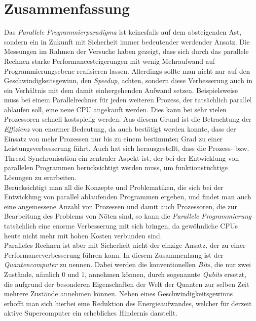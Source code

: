 
\chapter*{Zusammenfassung} %

	\thispagestyle{empty}

	Das \textit{Parallele Programmierparadigma} ist keinesfalls auf dem absteigenden Ast, sondern ein in Zukunft mit Sicherheit immer bedeutender werdender Ansatz. Die Messungen im Rahmen der Versuche haben gezeigt, dass sich durch das parallele Rechnen starke Performancesteigerungen mit wenig Mehraufwand auf Programmierungsebene realisieren lassen. Allerdings sollte man nicht nur auf den Geschwindigkeitsgewinn, den \textit{Speedup}, achten, sondern diese Verbesserung auch in ein Verhältnis mit dem damit einhergehenden Aufwand setzen. Beispielsweise muss bei einem Parallelrechner für jeden weiteren Prozess, der tatsächlich parallel ablaufen soll, eine neue CPU angekauft werden. Dies kann bei sehr vielen Prozessoren schnell kostspielig werden. Aus diesem Grund ist die Betrachtung der \textit{Effizienz} von enormer Bedeutung, da auch bestätigt werden konnte, dass der Einsatz von mehr Prozessen nur bis zu einem bestimmten Grad zu einer Leistungsverbesserung führt. Auch hat sich herausgestellt, dass die Prozess- bzw. Thread-Synchronisation ein zentraler Aspekt ist, der bei der Entwicklung von parallelen Programmen berücksichtigt werden muss, um funktionstüchtige Lösungen zu erarbeiten.\\
	Berücksichtigt man all die Konzepte und Problematiken, die sich bei der Entwicklung von parallel ablaufenden Programmen ergeben, und findet man auch eine angemessene Anzahl von Prozessen und damit auch Prozessoren, die zur Bearbeitung des Problems von Nöten sind, so kann die \textit{Parallele Programmierung} tatsächlich eine enorme Verbesserung mit sich bringen, da gewöhnliche CPUs heute nicht mehr mit hohen Kosten verbunden sind.\\
	Paralleles Rechnen ist aber mit Sicherheit nicht der einzige Ansatz, der zu einer Performanceverbesserung führen kann. In diesem Zusammenhang ist der \textit{Quantencomputer} zu nennen. Dabei werden die konventionellen \textit{Bits}, die nur zwei Zustände, nämlich 0 und 1, annehmen können, durch sogenannte \textit{Qubits} ersetzt, die aufgrund der besonderen Eigenschaften der Welt der Quanten zur selben Zeit mehrere Zustände annehmen können. Neben eines Geschwindigkeitsgewinns erhofft man sich hierbei eine Reduktion des Energieaufwandes, welcher für derzeit aktive Supercomputer ein erhebliches Hindernis darstellt. \cite{Quantencomputer}